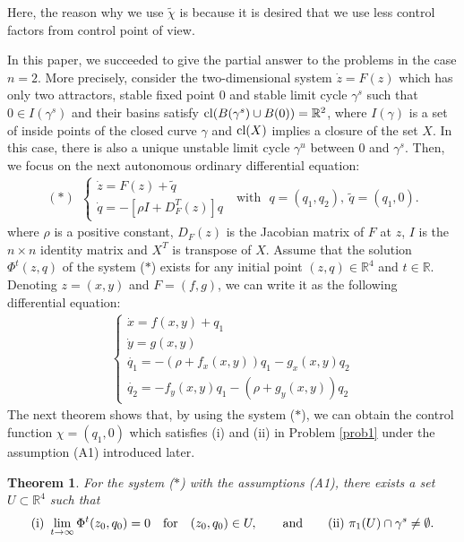 \documentclass[11pt,reqno]{amsart}
\newtheorem{maintheorem}{Theorem}
\begin{document}
Here, the reason why we use $\tilde{\chi}$ is because it is desired that we use less control factors from control point of view.

In this paper, we succeeded to give the partial answer to the problems in the case $n=2$. More precisely, consider the two-dimensional system $\dot{z}=F(z)$ which has only two attractors, stable fixed point 0 and stable limit cycle $\gamma^s$ such that $0\in I(\gamma^s)$ and their basins satisfy ${\rm cl}(B(\gamma^s)\cup B(0))=\mathbb{R}^2$, where $I(\gamma)$ is a set of inside points of the closed curve $\gamma$ and ${\rm cl}(X)$ implies a closure of the set $X$. In this case, there is also a unique unstable limit cycle $\gamma^u$ between 0 and $\gamma^s$. Then, we focus on the next autonomous ordinary differential equation:
\begin{eqnarray}
(\ast)\ \ \begin{cases}
\dot{z}=F(z)+\tilde{q}\\
\dot{q}=-[\rho I+D_F^T(z)]q
\end{cases}\ \ \ \text{with}\ \ \  q=(q_1,q_2),\ \tilde{q}=(q_1,0).\nonumber
\end{eqnarray}
where $\rho$ is a positive constant, $D_F(z)$ is the Jacobian matrix of $F$ at $z$, $I$ is the $n\times n$ identity matrix and $X^T$ is transpose of $X$. Assume that the solution $\Phi^t(z,q)$ of the system ($\ast$) exists for any initial point $(z,q)\in\mathbb{R}^4$ and $t\in\mathbb{R}$. Denoting $z=(x,y)$ and $F=(f,g)$, we can write it as the following differential equation:
\begin{eqnarray}
\begin{cases}
\dot{x}=f(x,y)+q_1\\
\dot{y}=g(x,y)\\
\dot{q_1}=-(\rho+f_x(x,y))q_1-g_x(x,y)q_2\\
\dot{q_2}=-f_y(x,y)q_1-(\rho+g_y(x,y))q_2
\end{cases}\nonumber
\end{eqnarray}
%
%
The next theorem shows that, by using the system ($\ast$), we can obtain the control function $\chi=(q_1,0)$ which satisfies (i) and (ii) in Problem \ref{prob1} under the assumption (A1) introduced later.
\begin{maintheorem}\label{maintheorem}
For the system ($\ast$) with the assumptions (A1), there exists a set $U\subset\mathbb{R}^4$ such that 
$$
{\rm(i)\ }\lim_{t\to\infty}\Phi^t(z_0,q_0)=0
\quad {\rm for}\quad (z_0,q_0)\in U,
\quad\quad {\rm and}\quad \quad
{\rm(ii)\ } \pi_1(U) \cap \gamma^s\neq\emptyset.
$$
\end{maintheorem}
\end{document}
